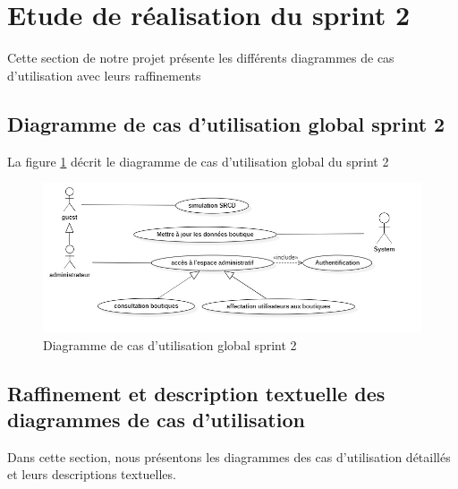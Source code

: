\section{Etude de réalisation du sprint 2}
Cette section de notre projet présente les différents diagrammes de cas d’utilisation avec leurs raffinements
\subsection{Diagramme de cas d’utilisation global sprint 2}
La figure \ref{fig:usecase-sprint2} décrit le diagramme de cas d’utilisation global du sprint 2
\begin{figure}[H]
	\centering
	\includegraphics[width=0.7\linewidth]{"img/conception/usecases/sprint 2/UseCase-sprint2"}
	\caption[Diagramme de cas d’utilisation global sprint 2]{Diagramme de cas d’utilisation global sprint 2}
	\label{fig:usecase-sprint2}
\end{figure}
\subsection{Raffinement et description textuelle des diagrammes de cas d’utilisation}
Dans cette section, nous présentons les diagrammes des cas d’utilisation détaillés et leurs descriptions textuelles.
\newpage
